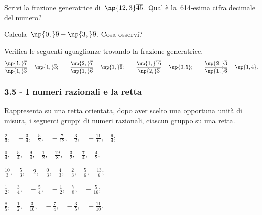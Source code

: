 \begin{esercizio}
\label{ese:3.30}
Scrivi la frazione generatrice di~$\np{12,3}\overline{45}$. Qual è la~614-esima cifra decimale del numero?
\end{esercizio}

\begin{esercizio}
\label{ese:3.31}
Calcola~$\np{0,}\overline{9}-\np{3,}\overline{9}$. Cosa osservi?
\end{esercizio}

\begin{esercizio}
\label{ese:3.32}
Verifica le seguenti uguaglianze trovando la frazione generatrice.
\[\frac{\np{1,}\overline{7}}{\np{1,}\overline{3}}=\np{1,}\overline{3};\qquad%
\frac{\np{2,}\overline{7}}{\np{1,}\overline{6}}=\np{1,}\overline{6};\qquad%
\frac{\np{1,}\overline{16}}{\np{2,}\overline{3}}=\np{0,5};\qquad%
\frac{\np{2,}\overline{3}}{\np{1,}\overline{6}}=\np{1,4}.\]
\end{esercizio}

\subsubsection*{3.5 - I numeri razionali e la retta}

\begin{esercizio}
 \label{ese:3.33}
Rappresenta su una retta orientata, dopo aver scelto una opportuna unità di misura,
i seguenti gruppi di numeri razionali, ciascun gruppo su una retta.
 \begin{enumeratea}
\spazielenx
 \item $\displaystyle{\frac{2}{3}\text{,}\quad-\frac{3}{4}\text{,}\quad\frac{5}{2}\text{,}\quad-\frac{7}{12}\text{,}\quad\frac{3}{2}\text{,}\quad%
-\frac{11}{6}\text{,}\quad\frac{9}{4}}$;
 \item $\displaystyle{\frac{0}{4}\text{,}\quad\frac{5}{4}\text{,}\quad\frac{9}{4}\text{,}\quad\frac{1}{2}\text{,}\quad\frac{19}{8}\text{,}\quad\frac{3}{2}%
\text{,}\quad\frac{7}{4}\text{,}\quad\frac{4}{2}}$;
 \item $\displaystyle{\frac{10}{3}\text{,}\quad\frac{5}{3}\text{,}\quad~2\text{,}\quad\frac{0}{3}\text{,}\quad\frac{4}{3}\text{,}\quad\frac{2}{3}%
\text{,}\quad\frac{5}{6}\text{,}\quad\frac{13}{6}}$;
 \item $\displaystyle{\frac{1}{2}\text{,}\quad\frac{3}{4}\text{,}\quad-\frac{5}{4}\text{,}\quad-\frac{1}{2}\text{,}\quad\frac{7}{8}\text{,}%
\quad-\frac{5}{16}}$;
\item $\displaystyle{\frac{8}{5}\text{,}\quad\frac{1}{2}\text{,}\quad\frac{3}{10}\text{,}\quad-\frac{7}{4}\text{,}\quad-\frac{3}{5}%
\text{,}\quad-\frac{11}{10}}$.
 \end{enumeratea}
\end{esercizio}

